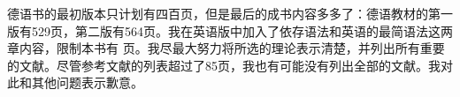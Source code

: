 德语书的最初版本只计划有四百页，但是最后的成书内容多多了：德语教材的第一版有529页，第二版有564页。我在英语版中加入了依存语法和英语的最简语法这两章内容，限制本书有\pageref{LastPage} 页。我尽最大努力将所选的理论表示清楚，并列出所有重要的文献。尽管参考文献的列表超过了85页，我也有可能没有列出全部的文献。我对此和其他问题表示歉意。









